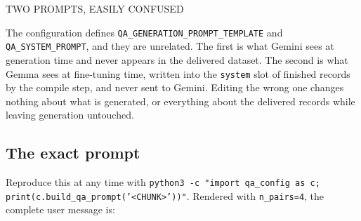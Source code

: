 \documentclass[10pt,a4paper]{article}
\newcommand{\codeid}[1]{\texttt{\footnotesize\color{inksoft}#1}}
\begin{document}
\begin{warmcard}
{\uimed\fontsize{8.5}{11}\selectfont\color{crail}TWO PROMPTS, EASILY CONFUSED}\par\vspace{0.3em}
The configuration defines \codeid{QA\_GENERATION\_PROMPT\_TEMPLATE} and
\codeid{QA\_SYSTEM\_PROMPT}, and they are unrelated. The first is what Gemini
sees at generation time and never appears in the delivered dataset. The second
is what Gemma sees at fine-tuning time, written into the \codeid{system} slot
of finished records by the compile step, and never sent to Gemini. Editing the
wrong one changes nothing about what is generated, or everything about the
delivered records while leaving generation untouched.
\end{warmcard}

\subsection{The exact prompt}

Reproduce this at any time with
\codeid{python3 -c "import qa\_config as c; print(c.build\_qa\_prompt('<CHUNK>'))"}.
Rendered with \codeid{n\_pairs=4}, the complete user message is:
\end{document}
